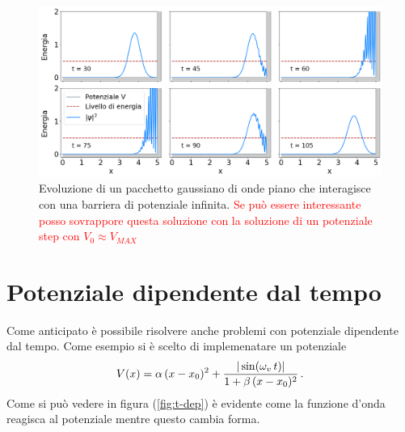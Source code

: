 \begin{figure}
    \centering
    \includegraphics[width = \textwidth]{immagini/inf.png}
    \caption{Evoluzione di un pacchetto gaussiano di onde piano che interagisce con una barriera di potenziale infinita. \textcolor{red}{Se può essere interessante posso sovrappore questa soluzione con la soluzione di un potenziale step con $V_0 \approx V_{MAX}$}}
    \label{fig:inf}
\end{figure}

\section{Potenziale dipendente dal tempo}
\label{sec:t_dep}

Come anticipato è possibile risolvere anche problemi con potenziale dipendente dal tempo.
Come esempio si è scelto di implemenatare un potenziale 
\begin{equation}
   \centering
   V(x) = \alpha \, (x-x_0)^2 +  \frac{| \sin (\omega_v  \, t) |} {1 + \beta \, (x-x_0)^2} \, \text{.}
\end{equation}
Come si può vedere in figura (\ref{fig:t-dep}) è evidente come la funzione d'onda reagisca al potenziale mentre questo cambia forma.

